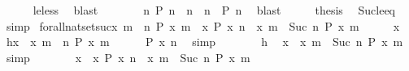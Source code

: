 \begin{isabellebody}
\ \ \ \ \isamarkupfalse%
\ le{\isacharunderscore}less\ \isamarkupfalse%
\ blast\isanewline
\ \ \isamarkupfalse%
\ \isamarkupfalse%
\ {\isacartoucheopen}{\isachardot}{\isachardot}{\isachardot}\ {\isacharequal}\ {\isacharparenleft}{\isasymexists}n{\isachardot}\ {\isacharparenleft}P\ n\ {\isasymor}\ {\isacharparenleft}n\ {\isachargreater}\ n\ {\isasymand}\ P\ n{\isacharparenright}{\isacharparenright}{\isacartoucheclose}\ \isamarkupfalse%
\ blast\isanewline
\ \ \isamarkupfalse%
\ \isamarkupfalse%
\ {\isacharquery}thesis\ \isamarkupfalse%
\ Suc{\isacharunderscore}le{\isacharunderscore}eq\ \isamarkupfalse%
\ simp\isanewline
{}\isamarkupfalse%
%
\endisatagproof
{\isafoldproof}%
%
\isadelimproof
\isanewline
%
\endisadelimproof
\isanewline
{}\isamarkupfalse%
\ forall{\isacharunderscore}nat{\isacharunderscore}set{\isacharunderscore}suc{\isacharcolon}{\isacartoucheopen}{\isacharbraceleft}x{\isachardot}\ {\isasymforall}m\ {\isasymge}\ n{\isachardot}\ P\ x\ m{\isacharbraceright}\ {\isacharequal}\ {\isacharbraceleft}x{\isachardot}\ P\ x\ n{\isacharbraceright}\ {\isasyminter}\ {\isacharbraceleft}x{\isachardot}\ {\isasymforall}m\ {\isasymge}\ Suc\ n{\isachardot}\ P\ x\ m{\isacharbraceright}{\isacartoucheclose}\isanewline
%
\isadelimproof
%
\endisadelimproof
%
\isatagproof
{}\isamarkupfalse%
\isanewline
\ \ \isacommand{{\isacharbraceleft}}\isamarkupfalse%
\ \isamarkupfalse%
\ x\ \isamarkupfalse%
\ h{\isacharcolon}{\isacartoucheopen}x\ {\isasymin}\ {\isacharbraceleft}x{\isachardot}\ {\isasymforall}m\ {\isasymge}\ n{\isachardot}\ P\ x\ m{\isacharbraceright}{\isacartoucheclose}\isanewline
\ \ \ \ \isamarkupfalse%
\ {\isacartoucheopen}P\ x\ n{\isacartoucheclose}\ \isamarkupfalse%
\ simp\isanewline
\ \ \ \ \isamarkupfalse%
\ \isamarkupfalse%
\ h\ \isamarkupfalse%
\ {\isacartoucheopen}x\ {\isasymin}\ {\isacharbraceleft}x{\isachardot}\ {\isasymforall}m\ {\isasymge}\ Suc\ n{\isachardot}\ P\ x\ m{\isacharbraceright}{\isacartoucheclose}\ \isamarkupfalse%
\ simp\isanewline
\ \ \ \ \isamarkupfalse%
\ \isamarkupfalse%
\ {\isacartoucheopen}x\ {\isasymin}\ {\isacharbraceleft}x{\isachardot}\ P\ x\ n{\isacharbraceright}\ {\isasyminter}\ {\isacharbraceleft}x{\isachardot}\ {\isasymforall}m\ {\isasymge}\ Suc\ n{\isachardot}\ P\ x\ m{\isacharbraceright}{\isacartoucheclose}\ \isamarkupfalse%

\end{isabellebody}
